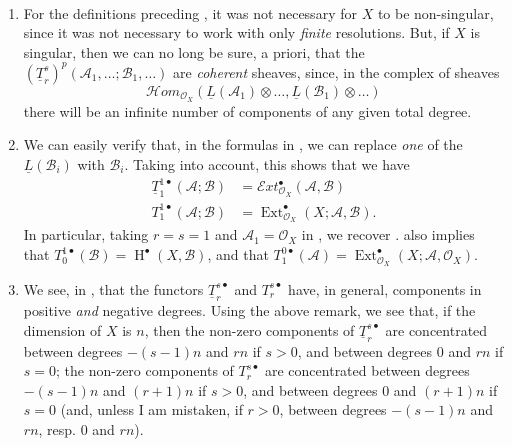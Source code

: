 \begin{remark}\label{fga1-8-remarks}
  ~
  \begin{enumerate}
    \item For the definitions preceding , it was not necessary for $X$ to be non-singular, since it was not necessary to work with only \emph{finite} resolutions.
          But, if $X$ is singular, then we can no long be sure, a priori, that the $(\underline{T}_r^s)^p(\mathcal{A}_1,\ldots;\mathcal{B}_1,\ldots)$ are \emph{coherent} sheaves, since, in the complex of sheaves
          \[\mathcal{H}om_{\mathcal{O}_X}(\underline{L}(\mathcal{A}_1)\otimes\ldots,\underline{L}(\mathcal{B}_1)\otimes\ldots)\]
          there will be an infinite number of components of any given total degree.
    \item We can easily verify that, in the formulas in , we can replace \emph{one} of the $\underline{L}(\mathcal{B}_i)$ with $\mathcal{B}_i$.
          Taking  into account, this shows that we have
          \begin{equation}\tag{8.8}\label{fga1-equation-8.8}
            \begin{aligned}
              \underline{T}_1^{1\bullet}(\mathcal{A};\mathcal{B})
               & = \mathcal{E}xt_{\mathcal{O}_X}^\bullet(\mathcal{A},\mathcal{B})
              \\T_1^{1\bullet}(\mathcal{A};\mathcal{B})
               & = \operatorname{Ext}_{\mathcal{O}_X}^\bullet(X;\mathcal{A},\mathcal{B}).
            \end{aligned}
          \end{equation}
          In particular, taking $r=s=1$ and $\mathcal{A}_1=\mathcal{O}_X$ in , we recover .
           also implies that $T_0^{1\bullet}(\mathcal{B})=\operatorname{H}^\bullet(X,\mathcal{B})$, and that $T_1^{0\bullet}(\mathcal{A})=\operatorname{Ext}_{\mathcal{O}_X}^\bullet(X;\mathcal{A},\mathcal{O}_X)$.
    \item We see, in , that the functors $\underline{T}_r^{s\bullet}$ and $T_r^{s\bullet}$ have, in general, components in positive \emph{and} negative degrees.
          Using the above remark, we see that, if the dimension of $X$ is $n$, then the non-zero components of $\underline{T}_r^{s\bullet}$ are concentrated between degrees $-(s-1)n$ and $rn$ if $s>0$, and between degrees $0$ and $rn$ if $s=0$; the non-zero components of $T_r^{s\bullet}$ are concentrated between degrees $-(s-1)n$ and $(r+1)n$ if $s>0$, and between degrees $0$ and $(r+1)n$ if $s=0$ (and, unless I am mistaken, if $r>0$, between degrees $-(s-1)n$ and $rn$, resp. $0$ and $rn$).
  \end{enumerate}
\end{remark}